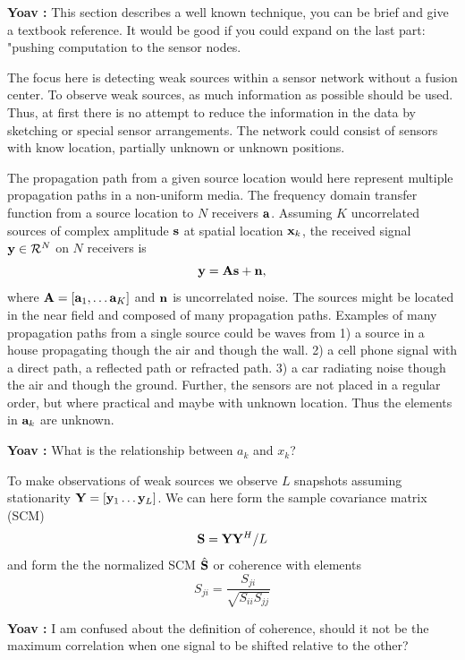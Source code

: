 \documentclass{article}
\newcommand{\comment}[3]{{\color{#1} {\bf #2 :} #3}}
\newcommand{\yoav}[1]{\comment{magenta}{Yoav}{#1}}
\begin{document}
\yoav{This section describes a well known technique, you can be brief and give a textbook reference. It would be good if you could expand on the last part: "pushing computation to the sensor nodes.}

The focus here is detecting weak sources within a sensor network without a fusion center. To observe weak sources, as much information as possible should be used. Thus, at first there is no attempt to reduce the information in the data by sketching or special sensor arrangements. The network could consist of sensors with know location, partially unknown or unknown positions.

The propagation path from a given source location would here represent multiple propagation paths in a non-uniform media. The frequency domain transfer function from a source location to $N$ receivers ${\bf a}$. Assuming $K$ uncorrelated sources of complex amplitude ${\bf s}$ at spatial location ${\bf x}_k$, the received signal ${\bf y}\in {\cal R}^N$ on $N$ receivers is 
\begin{equation}
{\bf y}={\bf A}{\bf s}+{\bf n},
\end{equation}
where ${\bf A}=[{\bf a}_1, \ldots {\bf a}_K ]$  and $\bf n$ is uncorrelated noise. 
The sources might be located in the near field and  composed of many propagation paths. Examples of many propagation paths from a single source could be waves from  
1) a source in a house propagating though the air and though the wall.
2) a cell phone signal with a direct path, a reflected path or refracted path.
3) a car radiating noise though the air and though the ground.
Further, the sensors are not placed in a regular order, but where practical and maybe with unknown location. Thus the elements in ${\bf a}_k$ are unknown.

\yoav{What is the relationship between $a_k$ and $x_k$?}

To make observations of weak sources we observe $L$ snapshots  assuming  stationarity ${\bf Y}=[{\bf y}_1 \ldots {\bf y}_L]$.
We can here form the sample covariance matrix (SCM)
\begin{equation}
{\bf S} ={\bf Y}{\bf Y}^H/L
\end{equation}
and form the the normalized SCM $\hat{\bf S}$ or coherence with elements
\begin{equation}
{ S}_{ji} =\frac{{ S}_{ji}}{\sqrt{ { S}_{ii}{ S}_{jj}}}
\end{equation}

\yoav{I am confused about the definition of coherence, should it not be the maximum correlation when one signal to be shifted relative to the other?}
\end{document}
